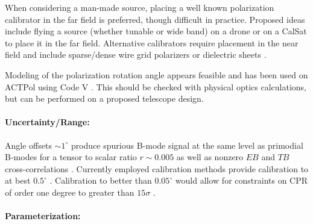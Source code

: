 When considering a man-made source, placing a well known polarization
calibrator in the far field is preferred, though difficult in practice.
Proposed ideas include flying a source (whether tunable or wide band) on a
drone or on a CalSat to place it in the far field. Alternative calibrators
require placement in the near field and include sparse/dense wire grid
polarizers or dielectric sheets \cite{Takahashi2010, 2016arXiv160701825K}.

Modeling of the polarization rotation angle appears feasible and has been used
on ACTPol using Code V \cite{2016arXiv160701825K}. This should be checked with
physical optics calculations, but can be performed on a proposed telescope
design.

\paragraph{Uncertainty/Range:}

Angle offsets $\sim 1^{\circ}$ produce spurious B-mode signal at the same level
as primodial B-modes for a tensor to scalar ratio $r \sim 0.005$ as well as
nonzero $EB$ and $TB$ cross-correlations \cite{doi:10.1142/S0218271816400125}.
Currently employed calibration methods provide calibration to at best
$0.5^{\circ}$ \cite{2016MNRAS.455.1981K}. Calibration to better than
$0.05^{\circ}$ would allow for constraints on CPR of order one degree to
greater than $15\sigma$ \cite{2016MNRAS.455.1981K}.

\paragraph{Parameterization:}
